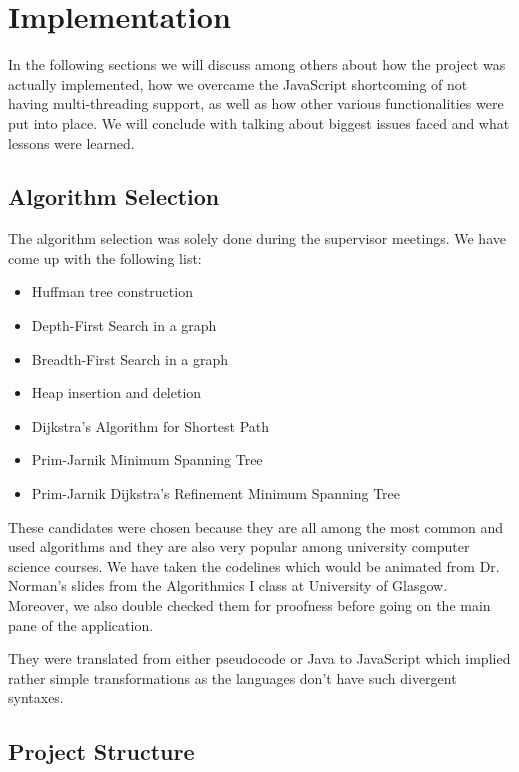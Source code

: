 \documentclass{l4proj}
\begin{document}
\chapter{Implementation}
\label{implementation}

In the following sections we will discuss among others about how the project was actually implemented, how we overcame the
JavaScript shortcoming of not having multi-threading support, as well as how other various functionalities were put
into place. We will conclude with talking about biggest issues faced and what lessons were learned. 

\section{Algorithm Selection}

The algorithm selection was solely done during the supervisor meetings. We have come up with the following list:

\begin{itemize}
    \item Huffman tree construction
    \item Depth-First Search in a graph
    \item Breadth-First Search in a graph
    \item Heap insertion and deletion
    \item Dijkstra's Algorithm for Shortest Path
    \item Prim-Jarnik Minimum Spanning Tree
    \item Prim-Jarnik Dijkstra's Refinement Minimum Spanning Tree
\end{itemize}

These candidates were chosen because they are all among the most common and used algorithms and they are also very
popular among university computer science courses. We have taken the codelines which would be animated from Dr.
Norman's slides from the Algorithmics I class at University of Glasgow. Moreover, we also double checked them for proofness
before going on the main pane of the application.

They were translated from either pseudocode or Java to JavaScript which implied rather simple transformations as
the languages don't have such divergent syntaxes. 

\section{Project Structure}
\end{document}

